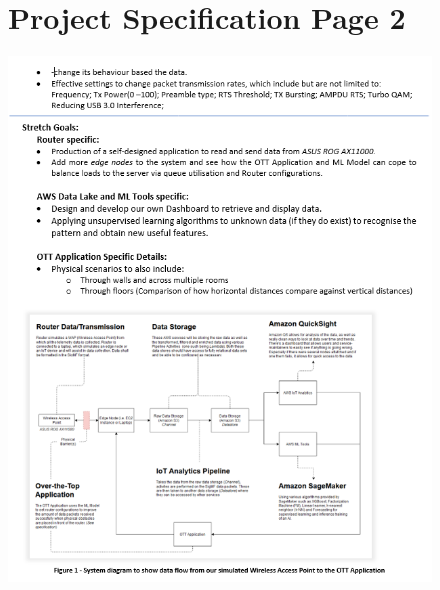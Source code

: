 \begin{figure}
\begin{minipage}{\linewidth}
\section{Project Specification Page 2}
    \centering
    \includegraphics[width=1\linewidth]{images/Specification/pg_2.png}
    \label{appendix:specification_page_2}
\end{minipage}
\end{figure}